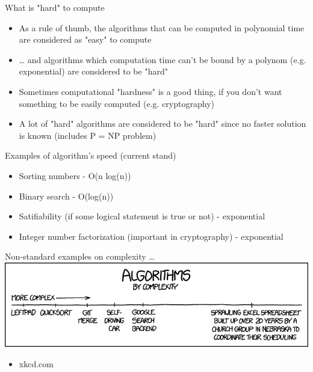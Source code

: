 \documentclass[presentation]{beamer}
\begin{document}
\begin{frame}[label=sec-2-22]{What is "hard" to compute}
\begin{itemize}
\item As a rule of thumb, the algorithms that can be computed in polynomial time are considered as "\alert{easy}" to compute
\item \ldots{} and algorithms which computation time can't be bound by a polynom (e.g. exponential) are considered to be "\alert{hard}"
\item Sometimes computational "hardness" is a good thing, if you don't want something to be easily computed (e.g. cryptography)
\item A lot of "hard" algorithms are considered to be "hard" since no faster solution is known (includes P = NP problem)
\end{itemize}
\end{frame}
\begin{frame}[label=sec-2-23]{Examples of algorithm's speed (current stand)}
\begin{itemize}
\item Sorting numbers - O(n log(n))
\item Binary search - O(log(n))
\item Satifiability (if some logical statement is true or not) - exponential
\item Integer number factorization (important in cryptography) - exponential
\end{itemize}
\end{frame}
\begin{frame}[label=sec-2-24]{Non-standard examples on complexity \ldots{}}
\includegraphics[width=.9\linewidth]{./img/xkcd_alg.png}
\begin{itemize}
\item xkcd.com
\end{itemize}
\end{frame}
\end{document}
